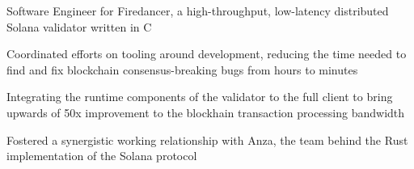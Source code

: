 \begin{cvitemize}
    \item Software Engineer for Firedancer, a high-throughput, low-latency distributed Solana validator written in C
    \item Coordinated efforts on tooling around development, reducing the time needed to find and fix blockchain consensus-breaking bugs from hours to minutes
    \item Integrating the runtime components of the validator to the full client to bring upwards of 50x improvement to the blockhain transaction processing bandwidth  
    \item Fostered a synergistic working relationship with Anza, the team behind the Rust implementation of the Solana protocol
\end{cvitemize}